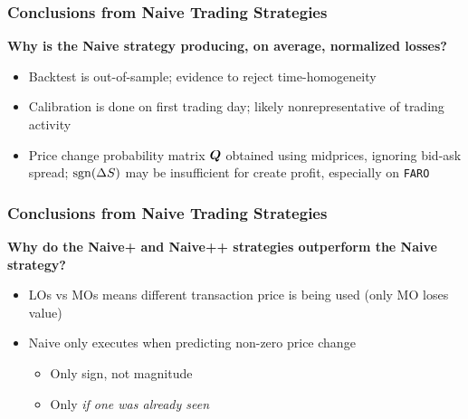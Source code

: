 \begin{frame}
\frametitle{Conclusions from Naive Trading Strategies}
{\bf Why is the Naive strategy producing, on average, normalized losses?}
\begin{itemize}
\item Backtest is out-of-sample; evidence to reject time-homogeneity
\item Calibration is done on first trading day; likely nonrepresentative of trading activity
\item Price change probability matrix $\boldsymbol{Q}$ obtained using midprices, ignoring bid-ask spread; $\operatorname{\mathrm{sgn}}(\Delta S)$ may be insufficient for create profit, especially on \texttt{FARO}
\end{itemize}
\end{frame}

\begin{frame}
\frametitle{Conclusions from Naive Trading Strategies}
{\bf Why do the Naive+ and Naive++ strategies outperform the Naive strategy?}
\begin{itemize}
\item LOs vs MOs means different transaction price is being used (only MO loses value)
\item Naive only executes when predicting non-zero price change
\begin{itemize}
\item Only sign, not magnitude
\item Only \emph{if one was already seen}
\end{itemize}
\end{itemize}
\end{frame}
